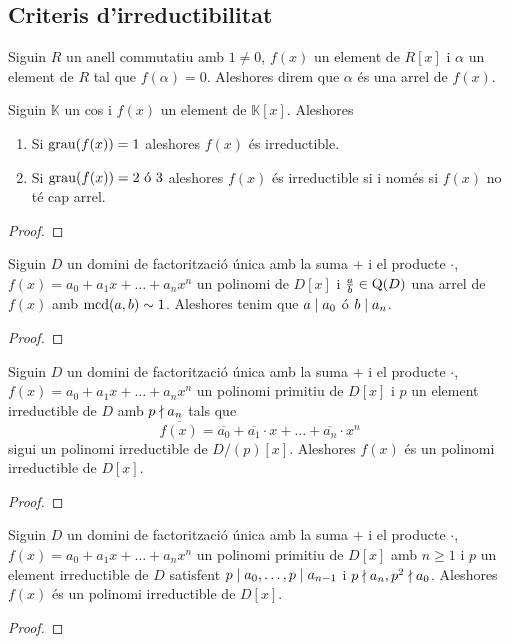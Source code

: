 \documentclass[../../Main.tex]{subfiles}
\begin{document}
	\subsection{Criteris d'irreductibilitat}
	\begin{definition}[Arrel]
		\label{def:arrel d'un polinomi}
		Siguin \(R\) un anell commutatiu amb \(1\neq0\), \(f(x)\) un element de \(R[x]\) i \(\alpha\) un element de \(R\) tal que \(f(\alpha)=0\). Aleshores direm que \(\alpha\) és una arrel de \(f(x)\).
	\end{definition}
	\begin{proposition}
		Siguin \(\mathbb{K}\) un cos i \(f(x)\) un element de \(\mathbb{K}[x]\). Aleshores
		\begin{enumerate}
			\item Si \(\operatorname{grau}(f(x))=1\) aleshores \(f(x)\) és irreductible.
			\item Si \(\operatorname{grau}(f(x))=2\text{ ó }3\) aleshores \(f(x)\) és irreductible si i només si \(f(x)\) no té cap arrel.
		\end{enumerate}
		\begin{proof}
		\end{proof}
	\end{proposition}
	\begin{proposition}
		Siguin \(D\) un domini de factorització única amb la suma \(+\) i el producte \(\cdot\), \(f(x)=a_{0}+a_{1}x+\dots+a_{n}x^{n}\) un polinomi de \(D[x]\) i \(\frac{a}{b}\in\operatorname{Q}(D)\) una arrel de \(f(x)\) amb \(\operatorname{mcd}(a,b)\sim1\). Aleshores tenim que \(a\mathrel{|} a_{0}\) ó \(b\mathrel{|} a_{n}\).
		\begin{proof}
		\end{proof}
	\end{proposition}
	\begin{theorem}
		\label{thm:Criteri modular}
		Siguin \(D\) un domini de factorització única amb la suma \(+\) i el producte \(\cdot\), \(f(x)=a_{0}+a_{1}x+\dots+a_{n}x^{n}\) un polinomi primitiu de \(D[x]\) i \(p\) un element irreductible de \(D\) amb \(p\mathrel{\nmid} a_{n}\) tals que
		\[\overline{f(x)}=\overline{a_{0}}+\overline{a_{1}}\cdot x+\dots+\overline{a_{n}}\cdot x^{n}\]
		sigui un polinomi irreductible de \(D/(p)[x]\). Aleshores \(f(x)\) és un polinomi irreductible de \(D[x]\).
		\begin{proof}
		\end{proof}
	\end{theorem}
	\begin{theorem}
		\label{thm:Criteri d'Eisenstein}
		Siguin \(D\) un domini de factorització única amb la suma \(+\) i el producte \(\cdot\), \(f(x)=a_{0}+a_{1}x+\dots+a_{n}x^{n}\) un polinomi primitiu de \(D[x]\) amb \(n\geq1\) i \(p\) un element irreductible de \(D\) satisfent \(p\mathrel{|} a_{0},\dots,p\mathrel{|} a_{n-1}\) i \(p\mathrel{\nmid} a_{n},p^{2}\mathrel{\nmid} a_{0}\). Aleshores \(f(x)\) és un polinomi irreductible de \(D[x]\).
		\begin{proof}
		\end{proof}
	\end{theorem}
\end{document}
